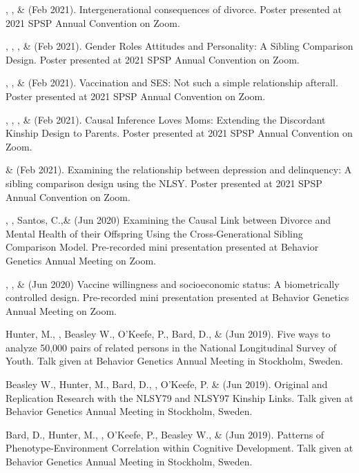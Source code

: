 \item \kl, \jt, \& \meb (Feb 2021). Intergenerational consequences of divorce. Poster presented at 2021 SPSP Annual Convention on Zoom.
%
\item \sherrym, \yrh, \jt, \& \meb (Feb 2021). Gender Roles Attitudes and Personality: A Sibling Comparison Design. Poster presented at 2021 SPSP Annual Convention on Zoom.
%
\item \jt, \kl, \& \meb (Feb 2021). Vaccination and SES: Not such a simple relationship afterall. Poster presented at 2021 SPSP Annual Convention on Zoom.

\item \meb, \emsims, \jt, \& \kl  (Feb 2021). Causal Inference Loves Moms: Extending the Discordant Kinship Design to Parents. Poster presented at 2021 SPSP Annual Convention on Zoom.
%
\item \emsims\hspace* {2 pt} \& \meb (Feb 2021). Examining the relationship between depression and delinquency: A sibling comparison design using the NLSY. Poster presented at 2021 SPSP Annual Convention on Zoom.

\item \kl, \jt, Santos, C.,\noteB \& \meb (Jun 2020) Examining the Causal Link between Divorce and Mental Health of their Offspring Using the Cross-Generational Sibling Comparison Model. Pre-recorded mini presentation presented at Behavior Genetics Annual Meeting on Zoom.
%
\item \jt, \kl, \& \meb (Jun 2020) Vaccine willingness and socioeconomic status: A biometrically controlled design. Pre-recorded mini presentation presented at Behavior Genetics Annual Meeting on Zoom. 
%
\item Hunter, M., \meb, Beasley W., O'Keefe, P.,  Bard, D., \& \Joe (Jun 2019). Five ways to analyze 50,000 pairs of related persons in the National Longitudinal Survey of Youth. Talk given at Behavior Genetics Annual Meeting in Stockholm, Sweden. 

\item Beasley W., Hunter, M., Bard, D., \meb, O'Keefe, P. \&  \Joe (Jun 2019). Original and Replication Research with the NLSY79 and NLSY97 Kinship Links. Talk given at Behavior Genetics Annual Meeting in Stockholm, Sweden. 
%
\item Bard, D., Hunter, M., \meb, O'Keefe, P., Beasley W.,  \&  \Joe (Jun 2019). Patterns of Phenotype-Environment Correlation within Cognitive Development. Talk given at Behavior Genetics Annual Meeting in Stockholm, Sweden. 


